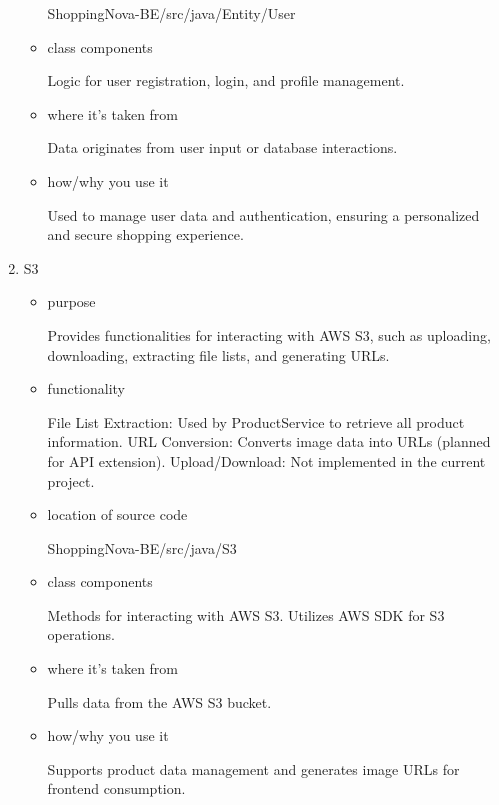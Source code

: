 \documentclass[conference]{IEEEtran}
\begin{document}
\begin{enumerate}
\begin{itemize}
ShoppingNova-BE/src/java/Entity/User

\item class components

Logic for user registration, login, and profile management.

\item where it's taken from

Data originates from user input or database interactions.

\item how/why you use it

Used to manage user data and authentication, ensuring a personalized and secure shopping experience.

\end{itemize}

\item S3 

\begin{itemize}
\item purpose

Provides functionalities for interacting with AWS S3, such as uploading, downloading, extracting file lists, and generating URLs.

\item functionality

File List Extraction: Used by ProductService to retrieve all product information.\newline
URL Conversion: Converts image data into URLs (planned for API extension).\newline
Upload/Download: Not implemented in the current project.

\item location of source code

ShoppingNova-BE/src/java/S3

\item class components

Methods for interacting with AWS S3.\newline 
Utilizes AWS SDK for S3 operations.

\item where it's taken from

Pulls data from the AWS S3 bucket.

\item how/why you use it

Supports product data management and generates image URLs for frontend consumption.

\end{itemize}

\end{enumerate}
\end{document}
